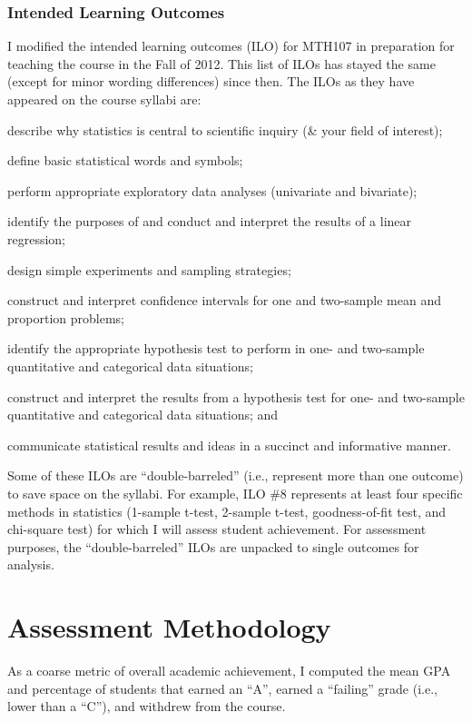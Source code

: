 \documentclass{article}\usepackage[]{graphicx}\usepackage[]{color}
\begin{document}
\subsubsection{Intended Learning Outcomes}
I modified the intended learning outcomes (ILO) for MTH107 in preparation for teaching the course in the Fall of 2012. This list of ILOs has stayed the same (except for minor wording differences) since then. The ILOs as they have appeared on the course syllabi are:

\begin{Enumerate}
  \item describe why statistics is central to scientific inquiry (\& your field of interest);
  \item define basic statistical words and symbols;
  \item perform appropriate exploratory data analyses (univariate and bivariate);
  \item identify the purposes of and conduct and interpret the results of a linear regression;
  \item design simple experiments and sampling strategies;
  \item construct and interpret confidence intervals for one and two-sample mean and proportion problems;
  \item identify the appropriate hypothesis test to perform in one- and two-sample quantitative and categorical data situations;
  \item construct and interpret the results from a hypothesis test for one- and two-sample quantitative and categorical data situations; and
  \item communicate statistical results and ideas in a succinct and informative manner.
\end{Enumerate}

Some of these ILOs are ``double-barreled'' (i.e., represent more than one outcome) to save space on the syllabi. For example, ILO \#8 represents at least four specific methods in statistics (1-sample t-test, 2-sample t-test, goodness-of-fit test, and chi-square test) for which I will assess student achievement. For assessment purposes, the ``double-barreled'' ILOs are unpacked to single outcomes for analysis.

\section{Assessment Methodology}
As a coarse metric of overall academic achievement, I computed the mean GPA and percentage of students that earned an ``A'', earned a ``failing'' grade (i.e., lower than a ``C''), and withdrew from the course.
\end{document}
